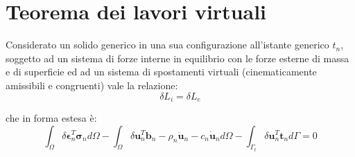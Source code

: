 \chapter{Teorema dei lavori virtuali}
Considerato un solido generico in una sua configurazione all'istante generico $t_n$, 
soggetto ad un  sistema di forze interne in equilibrio con le forze esterne di massa
 e di superficie ed ad un sistema di spostamenti virtuali (cinematicamente amissibili 
 e congruenti) vale la relazione:
\begin{equation}
	\delta L_i = \delta L_e 	
\end{equation}

che in forma estesa è:
\begin{equation}
	\int_\Omega \delta \boldsymbol{\epsilon}_n^T \boldsymbol{\sigma}_n d \Omega - \int_\Omega \delta\boldsymbol{u}_n^T \boldsymbol{b}_n-\rho_n\boldsymbol{\ddot{u}}_n-c_n \boldsymbol{\dot{u}}_n d \Omega - 
	\int_{\varGamma_t} \delta\boldsymbol{u}_n^T \boldsymbol{t}_n d \varGamma=0
\end{equation}


